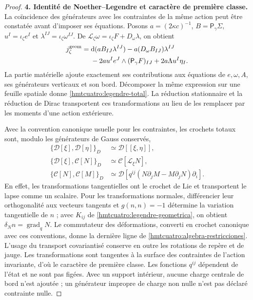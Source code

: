 \begin{proof}
\par\medskip\noindent\textbf{4. Identité de Noether--Legendre et caractère de première classe.}\quad
La coïncidence des générateurs avec les contraintes de la même action peut être constatée avant d’imposer ses équations. Posons \(a=(2\kappa c)^{-1}\), \(B=\mathsf P_\gamma\Sigma\), \(u^I=\iota_\zeta e^I\) et \(\lambda^{IJ}=\iota_\zeta\omega^{IJ}\). De \(\mathcal L_\zeta\omega=\iota_\zeta F+D_\omega\lambda\), on obtient
\begin{equation}
 \begin{split}
 j_\zeta^{\rm geom}
 ={}&\mathrm d(a B_{IJ}\lambda^{IJ})
   -a(D_\omega B_{IJ})\lambda^{IJ}\\
 &-2a u^Ie^J\wedge(\mathsf P_\gamma F)_{IJ}
       +2a\Lambda u^I\eta_I .
 \end{split}
 \label{hmtcuatro:noether-legendre}
\end{equation}
La partie matérielle ajoute exactement ses contributions aux équations de \(e,\omega,A\), ses générateurs verticaux et son bord. Décomposer la même expression sur une feuille spatiale donne \eqref{hmtcuatro:legendre-total}. La réduction stationnaire et la réduction de Dirac transportent ces transformations au lieu de les remplacer par les moments d’une action extérieure.

Avec la convention canonique usuelle pour les contraintes, les crochets totaux sont, modulo les générateurs de Gauss conservés,
\begin{equation}
 \begin{aligned}
 \{\mathcal D[\xi],\mathcal D[\eta]\}_D
    &\simeq\mathcal D[[\xi,\eta]],\\
 \{\mathcal D[\xi],\mathcal C[N]\}_D
    &\simeq\mathcal C[\mathcal L_\xi N],\\
 \{\mathcal C[N],\mathcal C[M]\}_D
    &\simeq\mathcal D[
       q^{ij}(N\partial_jM-M\partial_jN)\partial_i].
 \end{aligned}
 \label{hmtcuatro:algebra-restricciones}
\end{equation}
En effet, les transformations tangentielles ont le crochet de Lie et transportent le lapse comme un scalaire. Pour les transformations normales, différencier leur orthogonalité aux vecteurs tangents et \(g(n,n)=-1\) détermine la variation tangentielle de \(n\) ; avec \(K_{ij}\) de \eqref{hmtcuatro:legendre-geometrica}, on obtient \(\delta_N n=\operatorname{grad}_qN\). Le commutateur des déformations, converti en crochet canonique avec ces conventions, donne la dernière ligne de \eqref{hmtcuatro:algebra-restricciones}. L’usage du transport covariantisé conserve en outre les rotations de repère et de jauge. Les transformations sont tangentes à la surface des contraintes de l’action invariante, d’où le caractère de première classe. Les fonctions \(q^{ij}\) dépendent de l’état et ne sont pas figées. Avec un support intérieur, aucune charge centrale de bord n’est ajoutée ; un générateur impropre de charge non nulle n’est pas déclaré contrainte nulle.


\end{proof}
